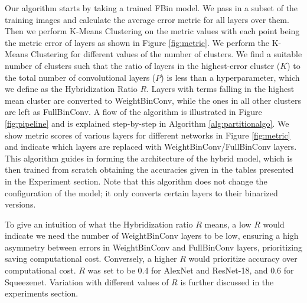\documentclass[10pt,twocolumn,letterpaper]{article}
\begin{document}
Our algorithm starts by taking a trained FBin model. We pass in a subset of the training images and calculate the average error metric for all layers over them. Then we perform K-Means Clustering on the metric values with each point being the metric error of layers as shown in Figure \ref{fig:metric}. We perform the K-Means Clustering for different values of the number of clusters. We find a suitable number of clusters such that the ratio of layers in the highest-error cluster ($K$) to the total number of convolutional layers ($P$) is less than a hyperparameter, which we define as the Hybridization Ratio $R$. Layers with terms falling in the highest mean cluster are converted to WeightBinConv, while the ones in all other clusters are left as FullBinConv. A flow of the algorithm is illustrated in Figure \ref{fig:pipeline} and is explained step-by-step in Algorithm \ref{alg:partitionalgo}. We show metric scores of various layers for different networks in Figure \ref{fig:metric} and indicate which layers are replaced with WeightBinConv/FullBinConv layers. This algorithm guides in forming the architecture of the hybrid model, which is then trained from scratch obtaining the accuracies given in the tables presented in the Experiment section. Note that this algorithm does not change the configuration of the model; it only converts certain layers to their binarized versions.

To give an intuition of what the Hybridization ratio $R$ means, a low $R$ would indicate we need the number of WeightBinConv layers to be low, ensuring a high asymmetry between errors in WeightBinConv and FullBinConv layers, prioritizing saving computational cost. Conversely, a higher $R$ would prioritize accuracy over computational cost. $R$ was set to be 0.4 for AlexNet and ResNet-18, and 0.6 for Squeezenet. Variation with different values of $R$ is further discussed in the experiments section.
\end{document}
